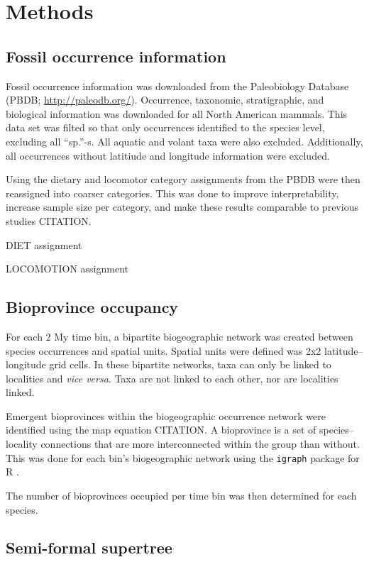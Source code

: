 \documentclass[12pt,letterpaper]{article}
\begin{document}
\section{Methods}

\subsection{Fossil occurrence information}

Fossil occurrence information was downloaded from the Paleobiology Database (PBDB; \url{http://paleodb.org/}). Occurrence, taxonomic, stratigraphic, and biological information was downloaded for all North American mammals. This data set was filted so that only occurrences identified to the species level, excluding all ``sp.''-s. All aquatic and volant taxa were also excluded. Additionally, all occurrences without latitiude and longitude information were excluded.

Using the dietary and locomotor category assignments from the PBDB were then reassigned into coarser categories. This was done to improve interpretability, increase sample size per category, and make these results comparable to previous studies CITATION.

DIET assignment

LOCOMOTION assignment


\subsection{Bioprovince occupancy}

For each 2 My time bin, a bipartite biogeographic network was created between species occurrences and spatial units. Spatial units were defined was 2x2 latitude--longitude grid cells. In these bipartite networks, taxa can only be linked to localities and \textit{vice versa}. Taxa are not linked to each other, nor are localities linked. 

Emergent bioprovinces within the biogeographic occurrence network were identified using the map equation CITATION. A bioprovince is a set of species--locality connections that are more interconnected within the group than without. This was done for each bin's biogeographic network using the \texttt{igraph} package for R \citep{csardi2006igraph,2014language}. 

The number of bioprovinces occupied per time bin was then determined for each species.


\subsection{Semi-formal supertree}
\end{document}
